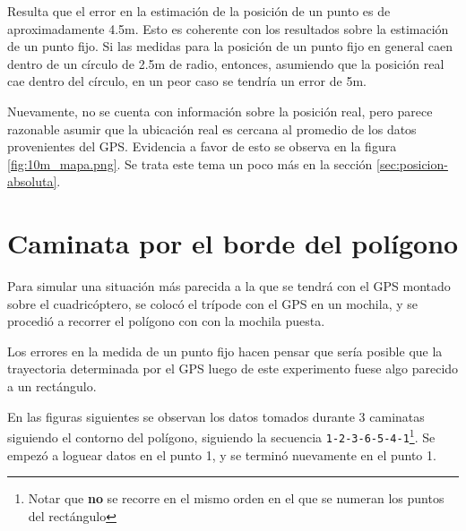 \documentclass[spanish,12pt,a4paper,titlepage]{report}
\begin{document}
Resulta que el error en la estimación de la posición de un punto es de aproximadamente 4.5m. Esto es coherente con los resultados sobre la estimación de un punto fijo. Si las medidas para la posición de un punto fijo en general caen dentro de un círculo de 2.5m de radio, entonces, asumiendo que la posición real cae dentro del círculo, en un peor caso se tendría un error de 5m. 

Nuevamente, no se cuenta con información sobre la posición real, pero parece razonable asumir que la ubicación real es cercana al promedio de los datos provenientes del GPS. Evidencia a favor de esto se observa en la figura \ref{fig:10m_mapa.png}. Se trata este tema un poco más en la sección \ref{sec:posicion-absoluta}.

\newpage
\section{Caminata por el borde del polígono}
\label{sec:caminata-por-el-borde-del-poligono}

Para simular una situación más parecida a la que se tendrá con el GPS montado sobre el cuadricóptero, se colocó el trípode con el GPS en un mochila, y se procedió a recorrer el polígono con con la mochila puesta.

Los errores en la medida de un punto fijo hacen pensar que sería posible que la trayectoria determinada por el GPS luego de este experimento fuese algo parecido a un rectángulo.

En las figuras siguientes se observan los datos tomados durante 3 caminatas siguiendo el contorno del polígono, siguiendo la secuencia \verb+1-2-3-6-5-4-1+\footnote{Notar que \textbf{no} se recorre en el mismo orden en el que se numeran los puntos del rectángulo}. Se empezó a loguear datos en el punto 1, y se terminó nuevamente en el punto 1.
\end{document}
